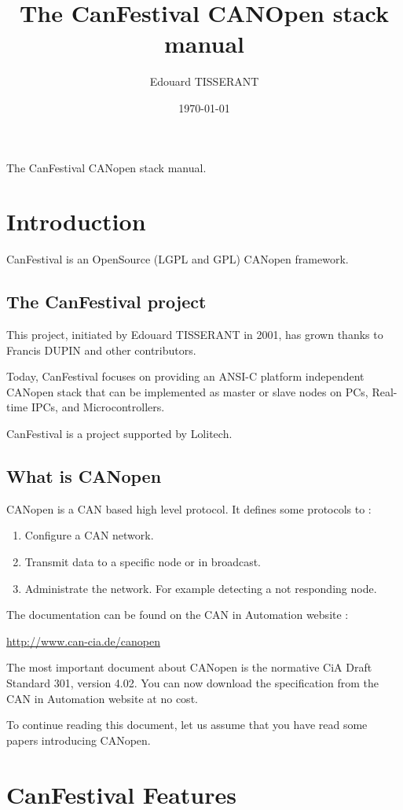 \documentclass[a4paper,12pt]{book}
\title{\Huge The CanFestival CANOpen stack manual}
\author{Edouard TISSERANT}
\date{\today}
\newcommand\liststyleLi{%
\renewcommand\labelitemi{{--}}
\renewcommand\labelitemii{{--}}
\renewcommand\labelitemiii{{--}}
\renewcommand\labelitemiv{{--}}
}
\newcommand{\canopen}{CANopen}
\begin{document}
{\centering\sffamily\Huge The CanFestival \canopen{} stack manual.}

\renewcommand\contentsname{CanFestival v3.0 Manual}
\setcounter{tocdepth}{2}
\tableofcontents
\section{Introduction}
CanFestival is an OpenSource (LGPL and GPL) \canopen{} framework.

\subsection{The CanFestival project}
This project, initiated by Edouard TISSERANT in 2001, has grown thanks to
Francis DUPIN and other contributors.

Today, CanFestival focuses on providing an ANSI{}-C platform independent
\canopen{} stack that can be implemented as master or slave nodes on PCs,
Real{}-time IPCs, and Microcontrollers.

CanFestival is a project supported by Lolitech.

\subsection{What is \canopen{}}
CANopen is a CAN based high level protocol. It defines some protocols to
:

\liststyleLi
\begin{enumerate}
\item Configure a CAN network.
\item Transmit data to a specific node or in broadcast.
\item Administrate the network. For example detecting a not responding
node.
\end{enumerate}
The documentation can be found on the CAN in Automation website :

\href{http://www.can-cia.de/canopen}{http://www.can{}-cia.de/canopen}

The most important document about \canopen{} is the normative CiA Draft
Standard 301, version 4.02. You can now download the specification from the
CAN in Automation website at no cost.

To continue reading this document, let us assume that you have read some
papers introducing \canopen{}.

\section{CanFestival Features}
\end{document}
